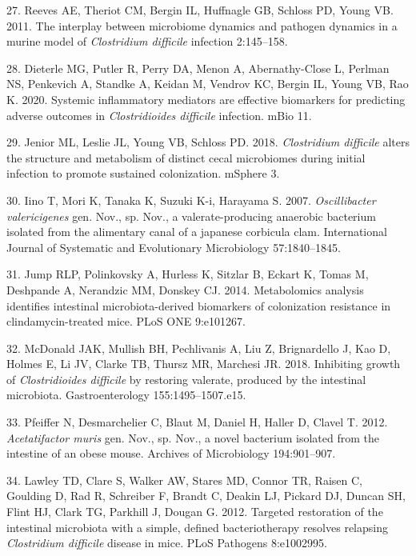 \documentclass[
  11pt,
]{article}
\begin{document}
\leavevmode\hypertarget{ref-Reeves2011}{}%
27. Reeves AE, Theriot CM, Bergin IL, Huffnagle GB, Schloss PD, Young
VB. 2011. The interplay between microbiome dynamics and pathogen
dynamics in a murine model of \emph{Clostridium difficile} infection
2:145--158.

\leavevmode\hypertarget{ref-Dieterle2020}{}%
28. Dieterle MG, Putler R, Perry DA, Menon A, Abernathy-Close L, Perlman
NS, Penkevich A, Standke A, Keidan M, Vendrov KC, Bergin IL, Young VB,
Rao K. 2020. Systemic inflammatory mediators are effective biomarkers
for predicting adverse outcomes in \emph{Clostridioides difficile}
infection. mBio 11.

\leavevmode\hypertarget{ref-Jenior2018}{}%
29. Jenior ML, Leslie JL, Young VB, Schloss PD. 2018. \emph{Clostridium
difficile} alters the structure and metabolism of distinct cecal
microbiomes during initial infection to promote sustained colonization.
mSphere 3.

\leavevmode\hypertarget{ref-Iino2007}{}%
30. Iino T, Mori K, Tanaka K, Suzuki K-i, Harayama S. 2007.
\emph{Oscillibacter valericigenes} gen. Nov., sp. Nov., a
valerate-producing anaerobic bacterium isolated from the alimentary
canal of a japanese corbicula clam. International Journal of Systematic
and Evolutionary Microbiology 57:1840--1845.

\leavevmode\hypertarget{ref-Jump2014}{}%
31. Jump RLP, Polinkovsky A, Hurless K, Sitzlar B, Eckart K, Tomas M,
Deshpande A, Nerandzic MM, Donskey CJ. 2014. Metabolomics analysis
identifies intestinal microbiota-derived biomarkers of colonization
resistance in clindamycin-treated mice. PLoS ONE 9:e101267.

\leavevmode\hypertarget{ref-McDonald2018}{}%
32. McDonald JAK, Mullish BH, Pechlivanis A, Liu Z, Brignardello J, Kao
D, Holmes E, Li JV, Clarke TB, Thursz MR, Marchesi JR. 2018. Inhibiting
growth of \emph{Clostridioides difficile} by restoring valerate,
produced by the intestinal microbiota. Gastroenterology
155:1495--1507.e15.

\leavevmode\hypertarget{ref-Pfeiffer2012}{}%
33. Pfeiffer N, Desmarchelier C, Blaut M, Daniel H, Haller D, Clavel T.
2012. \emph{Acetatifactor muris} gen. Nov., sp. Nov., a novel bacterium
isolated from the intestine of an obese mouse. Archives of Microbiology
194:901--907.

\leavevmode\hypertarget{ref-Lawley2012}{}%
34. Lawley TD, Clare S, Walker AW, Stares MD, Connor TR, Raisen C,
Goulding D, Rad R, Schreiber F, Brandt C, Deakin LJ, Pickard DJ, Duncan
SH, Flint HJ, Clark TG, Parkhill J, Dougan G. 2012. Targeted restoration
of the intestinal microbiota with a simple, defined bacteriotherapy
resolves relapsing \emph{Clostridium difficile} disease in mice. PLoS
Pathogens 8:e1002995.
\end{document}
